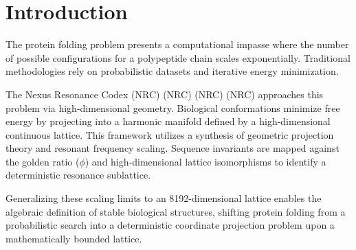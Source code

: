 \section{Introduction}

The protein folding problem presents a computational impasse where the number of possible configurations for a polypeptide chain scales exponentially. Traditional methodologies rely on probabilistic datasets and iterative energy minimization. 

The Nexus Resonance Codex (NRC) (NRC) (NRC) (NRC) approaches this problem via high-dimensional geometry. Biological conformations minimize free energy by projecting into a harmonic manifold defined by a high-dimensional continuous lattice. This framework utilizes a synthesis of geometric projection theory and resonant frequency scaling. Sequence invariants are mapped against the golden ratio ($\phi$) and high-dimensional lattice isomorphisms to identify a deterministic resonance sublattice.

Generalizing these scaling limits to an 8192-dimensional lattice enables the algebraic definition of stable biological structures, shifting protein folding from a probabilistic search into a deterministic coordinate projection problem upon a mathematically bounded lattice.
